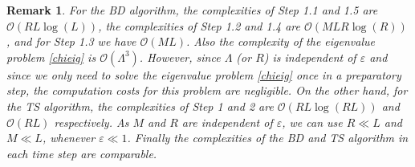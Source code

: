 \documentclass[leqno,final]{siamltex}
\newtheorem{remark}{Remark}[section]
\numberwithin{equation}{section}
\newcounter{me}
\begin{document}
\begin{remark}\label{rmk_complexity}
For the BD algorithm, the complexities of Step 1.1 and 1.5 are
${\mathcal O}(RL \log (L))$, the complexities of Step 1.2 and 1.4 are
${\mathcal O}(MLR\log(R))$, and for Step 1.3 we have ${\mathcal O}(ML)$. Also the
complexity of the eigenvalue problem \eqref{chieig} is
${\mathcal O}({\Lambda}^3)$. However, since ${\Lambda}$ (or $R$) is independent of ${{\varepsilon }}$
and since we only need to solve the eigenvalue problem
\eqref{chieig} once in a preparatory step, the computation costs
for this problem are negligible. On the other hand, for the TS
algorithm, the complexities of Step 1 and 2 are ${\mathcal O}(RL \log (RL))$
and ${\mathcal O}(RL)$ respectively. As $M$ and $R$ are independent of ${{\varepsilon }}$,
we can use $R \ll L$ and $M\ll L$, whenever ${{\varepsilon }} \ll 1$. Finally
the complexities of the BD and TS algorithm in each time step are
comparable.
\end{remark}
\end{document}
